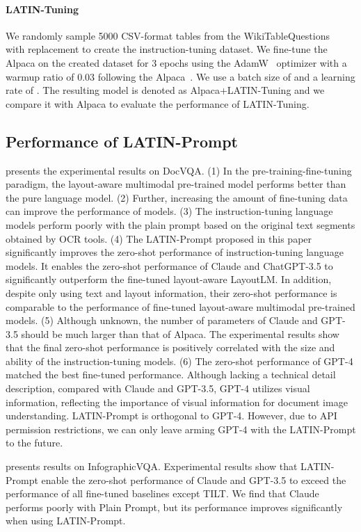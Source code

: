 \documentclass[letterpaper]{article} \usepackage{aaai24_preprint}  \usepackage{times}  \usepackage{helvet}  \usepackage{courier}  \usepackage[hyphens]{url}  \usepackage{graphicx} \urlstyle{rm} \def\UrlFont{\rm}  \usepackage{natbib}  \usepackage{caption} \frenchspacing  \setlength{\pdfpagewidth}{8.5in} \setlength{\pdfpageheight}{11in} \usepackage{algorithm}
\begin{document}
\paragraph{LATIN-Tuning} We randomly sample 5000 CSV-format tables from the WikiTableQuestions~\cite{pasupatWikiTableQuestions2015} with replacement to create the instruction-tuning dataset.
We fine-tune the Alpaca on the created dataset for 3 epochs using the AdamW~\cite{loshchilovAdamW2018} optimizer with a warmup ratio of 0.03 following the Alpaca~\cite{StanfordAlpacaInstructionfollowing2023}.
We use a batch size of  and a learning rate of .
The resulting model is denoted as Alpaca+LATIN-Tuning and we compare it with Alpaca to evaluate the performance of LATIN-Tuning.

\subsection{Performance of LATIN-Prompt}
 presents the experimental results on DocVQA.
(1) In the pre-training-fine-tuning paradigm, the layout-aware multimodal pre-trained model performs better than the pure language model.
(2) Further, increasing the amount of fine-tuning data can improve the performance of models.
(3) The instruction-tuning language models perform poorly with the plain prompt based on the original text segments obtained by OCR tools.
(4) The LATIN-Prompt proposed in this paper significantly improves the zero-shot performance of instruction-tuning language models.
It enables the zero-shot performance of Claude and ChatGPT-3.5 to significantly outperform the fine-tuned layout-aware LayoutLM.
In addition, despite only using text and layout information, their zero-shot performance is comparable to the performance of fine-tuned layout-aware multimodal pre-trained models.
(5) Although unknown, the number of parameters of Claude and GPT-3.5 should be much larger than that of Alpaca.
The experimental results show that the final zero-shot performance is positively correlated with the size and ability of the instruction-tuning models.
(6) The zero-shot performance of GPT-4 matched the best fine-tuned performance.
Although lacking a technical detail description, compared with Claude and GPT-3.5, GPT-4 utilizes visual information, reflecting the importance of visual information for document image understanding.
LATIN-Prompt is orthogonal to GPT-4.
However, due to API permission restrictions, we can only leave arming GPT-4 with the LATIN-Prompt to the future.

 presents results on InfographicVQA.
Experimental results show that LATIN-Prompt enable the zero-shot performance of Claude and GPT-3.5 to exceed the performance of all fine-tuned baselines except TILT.
We find that Claude performs poorly with Plain Prompt, but its performance improves significantly when using LATIN-Prompt.
\end{document}
